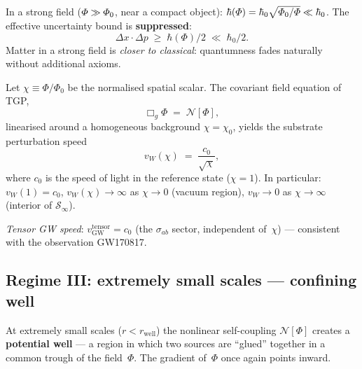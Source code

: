 \begin{corollary}%
\label{cor:uncertainty-variable}
In a strong field ($\varPhi \gg \varPhi_0$, near a compact object):
$\hbar(\varPhi) = \hbar_0\sqrt{\varPhi_0/\varPhi} \ll \hbar_0$.
The effective uncertainty bound is \textbf{suppressed}:
\[
  \Delta x \cdot \Delta p \;\geq\; \hbar(\Phi)/2
  \;\ll\; \hbar_0/2.
\]
Matter in a strong field is \emph{closer to classical}: quantumness
fades naturally without additional axioms.
\end{corollary}

\begin{proposition}%
\label{prop:vW-substrate}
Let $\chi \equiv \Phi/\Phi_0$ be the normalised spatial scalar.
The covariant field equation of TGP,
\begin{equation}\label{eq:field-eq-covariant}
  \Box_g\Phi \;=\; \mathcal{N}[\Phi],
\end{equation}
linearised around a homogeneous background $\chi = \chi_0$, yields
the substrate perturbation speed
\begin{equation}\label{eq:vW-formula}
  v_W(\chi)
  \;=\; \frac{c_0}{\sqrt{\chi}},
\end{equation}
where $c_0$ is the speed of light in the reference state
($\chi = 1$).  In particular: $v_W(1) = c_0$,
$v_W(\chi) \to \infty$ as $\chi \to 0$ (vacuum region),
$v_W \to 0$ as $\chi \to \infty$
(interior of $\mathcal{S}_\infty$).

\medskip\noindent
\emph{Tensor GW speed}:
$v_{\mathrm{GW}}^{\mathrm{tensor}} = c_0$ (the $\sigma_{ab}$
sector, independent of~$\chi$) --- consistent with the observation
GW170817.
\end{proposition}

\subsection{Regime III: extremely small scales --- confining well}%
\label{ssec:studnia}

\begin{proposition}\label{prop:well}
At extremely small scales ($r < r_{\mathrm{well}}$) the nonlinear
self-coupling $\mathcal{N}[\Phi]$ creates a \textbf{potential well}
--- a region in which two sources are ``glued'' together in a common
trough of the field~$\Phi$.  The gradient of~$\Phi$ once again
points inward.
\end{proposition}

